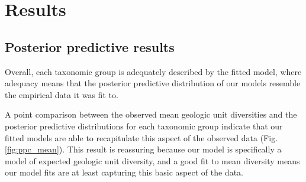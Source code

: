 \documentclass[12pt,letterpaper]{article}
\begin{document}
\section{Results}

\subsection{Posterior predictive results}



Overall, each taxonomic group is adequately described by the fitted model, where adequacy means that the posterior predictive distribution of our models resemble the empirical data it was fit to. 

A point comparison between the observed mean geologic unit diversities and the posterior predictive distributions for each taxonomic group indicate that our fitted models are able to recapitulate this aspect of the observed data (Fig. \ref{fig:ppc_mean}). This result is reassuring because our model is specifically a model of expected geologic unit diversity, and a good fit to mean diversity means our model fits are at least capturing this basic aspect of the data.
\end{document}
